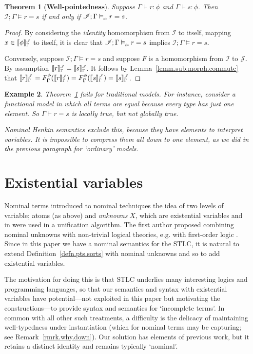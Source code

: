 \documentclass[submission,copyright]{eptcs}
\newtheorem{thrm}{Theorem}[section]
\newtheorem{xmpl}[thrm]{Example}
\newcommand\den[1]{{\hspace{.00ex}\scalebox{.55}{$#1$}}}
\newcommand{\idenot}[2]{\denot{\interp I}{#1}{#2}}
\newcommand{\jdenot}[2]{\denot{\interp J}{#1}{#2}}
\newcommand\interp[1]{\ensuremath{\mathscr #1}}
\newcommand{\denot}[3]{\llbracket #3 \rrbracket_{\scalebox{.6}{$#2$}}^\den{#1}} \newcommand{\hdenot}[1]{\denot{\interp H}{}{#1}}
\newcommand\cent{\vdash}
\newcommand\ment{\vDash}
\newcommand\gloment{\vDash_{\scalebox{.4}{glo}}}
\begin{document}
\begin{thrm}[\bf Well-pointedness]
\label{thrm.well-pointed}
Suppose $\Gamma\cent r:\phi$ and $\Gamma\cent s:\phi$. 
Then $\interp I;\Gamma\ment r=s$ if and only if $\interp I;\Gamma\gloment r=s$. 
\end{thrm}
\begin{proof}
By considering the \emph{identity} homomorphism from $\interp I$ to itself, mapping $x\in\idenot{\Gamma}{\phi}$ to itself, it is clear that $\interp I;\Gamma\gloment r=s$ implies $\interp I;\Gamma\ment r=s$.

Conversely, suppose $\interp I;\Gamma\ment r=s$ and suppose $F$ is a homomorphism from $\interp I$ to $\interp J$.
By assumption $\idenot{\Gamma}{r}=\idenot{\Gamma}{s}$.
It follows by Lemma~\ref{lemm.sub.morph.commute} that $\jdenot{\Gamma}{r}=F^\phi_\Gamma(\idenot{\Gamma}{r})=F^\phi_\Gamma(\jdenot{\Gamma}{s})=\jdenot{\Gamma}{s}$.
\end{proof}

\begin{xmpl}
\label{xmpl.one.point}
Theorem~\ref{thrm.well-pointed} fails for traditional models.
For instance, consider a functional model in which all terms are equal because every type has just one element.
So $\Gamma\cent r=s$ is locally true, but not globally true.

Nominal Henkin semantics exclude this, because they have elements to interpret variables.
It is impossible to compress them all down to one element, as we did in the previous paragraph for `ordinary' models. 
\end{xmpl}


\section{Existential variables}
\label{sect.existential.variables}

Nominal terms introduced to nominal techniques the idea of two levels of variable; atoms (as above) and \emph{unknowns} $X$, which are existential variables and in \cite{gabbay:nomu-jv} were used in a unification algorithm. 
The first author proposed combining nominal unknowns with non-trivial logical theories, e.g. with first-order logic \cite{gabbay:oneaah,gabbay:oneaah-jv}.
Since in this paper we have a nominal semantics for the STLC, it is natural to extend Definition~\ref{defn.pts.sorts} with nominal unknowns and so to add existential variables.

The motivation for doing this is that STLC underlies many interesting logics and programming languages, so that our semantics and syntax with existential variables have potential---not exploited in this paper but motivating the constructions---to provide syntax and semantics for `incomplete terms'.
In common with all other such treatments, a difficulty is the delicacy of maintaining well-typedness under instantiation (which for nominal terms may be capturing; see Remark~\ref{rmrk.why.down}).
Our solution has elements of previous work, but it retains a distinct identity and remains typically `nominal'.
\end{document}
